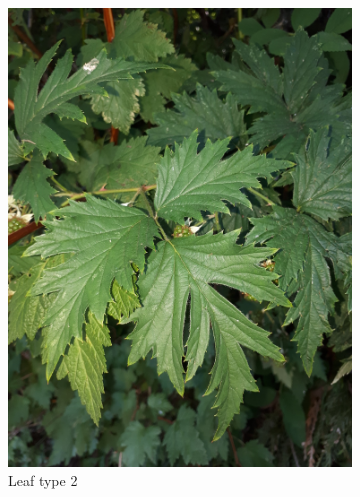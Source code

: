 \begin{figure}
\begin{subfigure}{0.48\textwidth}
    \includegraphics[width=\textwidth]{rubus/laciniatus_leaf_03}
    \caption{Leaf type 2}
    \label{fig:rub:laciniatus:flower}
\end{subfigure}
\hfill
\begin{subfigure}{0.48\textwidth}

\end{subfigure}
\end{figure}
